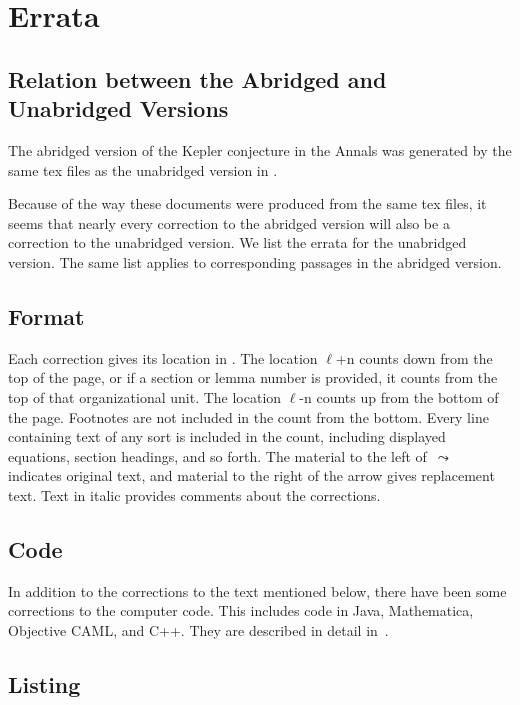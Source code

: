 \documentclass[11pt]{amsart}
\def\lto{\ensuremath{\,\leadsto\,}}
\def\line{$\ell$}
\begin{document}
{}\baselineskip
\section{Errata}


\subsection*{Relation between the Abridged and Unabridged Versions}

The abridged version of the Kepler conjecture
in the Annals \cite{Hales:2005:Annals}
was generated by the same tex
files as the unabridged version in \cite{Hales:2006:DCG}.

Because of the way these documents were produced
from the same tex files,
it seems that nearly every correction to
the abridged version will also be a correction to the unabridged version.
We list the errata for the
unabridged version. The same list applies to corresponding 
passages in the abridged version.  


\subsection*{Format}

Each correction gives its location in \cite{Hales:2006:DCG}.
The location
\line+n counts down from the top of the page, or
if a section or lemma number is provided, it
counts from the top of that organizational unit.
The location \line-n counts up from the bottom
of the page. Footnotes are not included in the
count from the bottom.  Every line containing
text of any sort is included in the count,
including displayed equations, section headings,
and so forth.  The material to the left of $\lto$ 
indicates original text, and material to the right of the
arrow gives replacement text.  Text in italic provides
comments about the corrections.


\subsection*{Code}

In addition to the corrections to the text mentioned below, 
there have been some corrections to the computer code.
This includes code in Java, Mathematica, Objective CAML, and C++.
They are described in detail in~\cite{Hales:2008:Errata}.


\subsection*{Listing}
\end{document}
